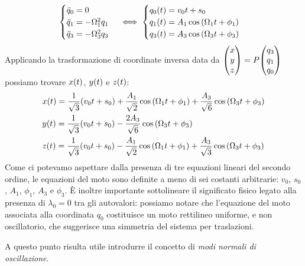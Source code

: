         \begin{equation*}
        \begin{cases}
            \ddot{q}_0=0\\
            \ddot{q}_1=-\Omega_1^2q_1\\
            \ddot{q}_3=-\Omega_3^2q_3
        \end{cases}
        \iff
        \begin{cases}
            q_0\qty(t)=v_0t+s_0\\
            q_1\qty(t)=A_1\cos\qty(\Omega_1 t+\phi_1)\\
            q_3\qty(t)=A_3\cos\qty(\Omega_3 t+\phi_3)
        \end{cases}
        \end{equation*}
        Applicando la trasformazione di coordinate inversa data da $\mqty(x \\ y \\ z)=P\mqty(q_3 \\ q_1 \\ q_0)$ possiamo trovare $x\qty(t)$, $y\qty(t)$ e $z\qty(t)$:
        \begin{align*}
            &x\qty(t)=\frac{1}{\sqrt{3}}\qty(v_0t+s_0)+\frac{A_1}{\sqrt{2}}\cos\qty(\Omega_1t+\phi_1)+\frac{A_3}{\sqrt{6}}\cos\qty(\Omega_3t+\phi_3)\\
            &y\qty(t)=\frac{1}{\sqrt{3}}\qty(v_0t+s_0)-\frac{2A_3}{\sqrt{6}}\cos\qty(\Omega_3t+\phi_3)\\
            &z\qty(t)=\frac{1}{\sqrt{3}}\qty(v_0t+s_0)-\frac{A_1}{\sqrt{2}}\cos\qty(\Omega_1t+\phi_1)+\frac{A_3}{\sqrt{3}}\cos\qty(\Omega_3t+\phi_3)
        \end{align*}
        Come ci potevamo aspettare dalla presenza di tre equazioni lineari del secondo ordine, le equazioni del moto sono definite a meno di sei costanti arbitrarie: $v_0$, $s_0$, $A_1$, $\phi_1$, $A_3$ e $\phi_3$. \`E inoltre importante sottolineare il significato fisico legato alla presenza di $\lambda_0=0$ tra gli autovalori: possiamo notare che l'equazione del moto associata alla coordinata $q_0$ costituisce un moto rettilineo uniforme, e non oscillatorio, che suggerisce una simmetria del sistema per traslazioni. \par A questo punto risulta utile introdurre il concetto di \emph{modi normali di oscillazione}.
